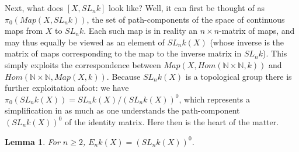 \documentclass[openany,leqno]{book}  %
\newcommand{\N}{\mathbb{N}}
\newtheorem{lemma}[theorem]{Lemma}
\begin{document}
Next, what does $[X,SL_n k]$ look like? Well, it can first be thought of as $\pi_0(Map(X,SL_n k))$, the set of path-components of the space of continuous maps from $X$ to $SL_nk$. Each such map is in reality an $n\times n$-matrix of maps, and may thus equally be viewed as an element of $SL_n k(X)$ (whose inverse is the matrix of maps corresponding to the map to the inverse matrix in $SL_n k $). This simply exploits the correspondence between $Map(X,Hom(\N\times \N,k))$ and
$Hom(\N\times \N,Map(X,k))$. Because $SL_nk(X)$ is a topological group there is further exploitation afoot: we have $\pi_0(SL_nk(X))=SL_nk(X)/(SL_nk(X))^0$, which represents a simplification in as much as one understands the path-component $(SL_nk(X))^0$ of the identity matrix. Here then is the heart of the matter.
\begin{lemma}
For $n\geqslant 2$, $E_nk(X)=(SL_nk(X))^0$.
\end{lemma}
\end{document}
